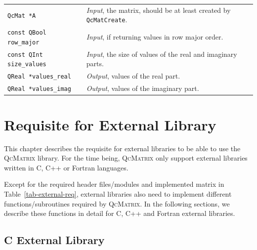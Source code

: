 \documentclass[a4paper,11pt,twoside,openright]{book}
\begin{document}
\begin{center}
\begin{longtable}{l|p{}}
    \hspace*{2ex}\verb|QcMat *A| %
      & \textsl{Input}, the matrix, should be at least created by \verb|QcMatCreate|.\\
    \hspace*{2ex}\verb|const QBool row_major| %
      & \textsl{Input}, if returning values in row major order.\\
    \hspace*{2ex}\verb|const QInt size_values| %
      & \textsl{Input}, the size of values of the real and imaginary parts.\\
    \hspace*{2ex}\verb|QReal *values_real| %
      & \textsl{Output}, values of the real part.\\
    \hspace*{2ex}\verb|QReal *values_imag| %
      & \textsl{Output}, values of the imaginary part.
%
  \end{longtable}
\end{center}

\chapter{Requisite for External Library}
\label{chapter-external-lib}

This chapter describes the requisite for external libraries to be able to use the
\textsc{QcMatrix} library. For the time being, \textsc{QcMatrix} only support external
libraries written in C, C++ or Fortran languages.

Except for the required header files/modules and implemented matrix in Table~\ref{tab-external-req},
external libraries also need to implement different functions/subroutines required
by \textsc{QcMatrix}. In the following sections, we describe these functions in
detail for C, C++ and Fortran external libraries.

\section{C External Library}
\label{section-c-external}
\end{document}
